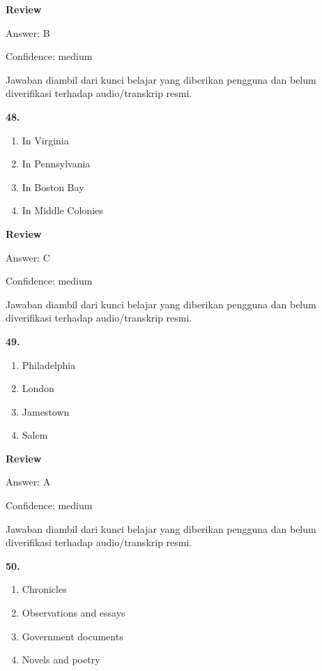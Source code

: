 \documentclass[12pt]{article}
\begin{document}
\setlength{\parskip}{0pt}
\setlength{\parindent}{0pt}
\textbf{Review}\par
Answer: B\par
Confidence: medium\par
Jawaban diambil dari kunci belajar yang diberikan pengguna dan belum diverifikasi terhadap audio/transkrip resmi.\par
\endgroup
\par
\vspace{0.25\baselineskip}
\noindent\textbf{48.}
\begin{enumerate}[label=(\Alph*),leftmargin=*,itemsep=0.2em]
\item In Virginia
\item In Pennsylvania
\item In Boston Bay
\item In Middle Colonies
\end{enumerate}
\par
\begingroup
\setlength{\parskip}{0pt}
\setlength{\parindent}{0pt}
\textbf{Review}\par
Answer: C\par
Confidence: medium\par
Jawaban diambil dari kunci belajar yang diberikan pengguna dan belum diverifikasi terhadap audio/transkrip resmi.\par
\endgroup
\par
\vspace{0.25\baselineskip}
\noindent\textbf{49.}
\begin{enumerate}[label=(\Alph*),leftmargin=*,itemsep=0.2em]
\item Philadelphia
\item London
\item Jamestown
\item Salem
\end{enumerate}
\par
\begingroup
\setlength{\parskip}{0pt}
\setlength{\parindent}{0pt}
\textbf{Review}\par
Answer: A\par
Confidence: medium\par
Jawaban diambil dari kunci belajar yang diberikan pengguna dan belum diverifikasi terhadap audio/transkrip resmi.\par
\endgroup
\par
\vspace{0.25\baselineskip}
\noindent\textbf{50.}
\begin{enumerate}[label=(\Alph*),leftmargin=*,itemsep=0.2em]
\item Chronicles
\item Observations and essays
\item Government documents
\item Novels and poetry
\end{enumerate}
\end{document}
